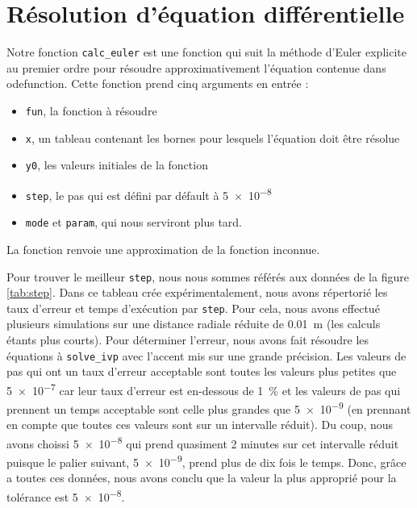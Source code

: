 \documentclass[11pt]{report}
\begin{document}
    \section{Résolution d'équation différentielle}
      Notre fonction \verb|calc_euler| est une fonction qui suit la méthode d'Euler explicite au premier ordre
      pour résoudre approximativement l'équation contenue dans odefunction.
      Cette fonction prend cinq arguments en entrée :
      \begin{itemize}
        \item \verb|fun|, la fonction à résoudre
        \item \verb|x|, un tableau contenant les bornes pour lesquels l'équation doit être résolue
        \item \verb|y0|, les valeurs initiales de la fonction
        \item \verb|step|, le pas qui est défini par défault à \num{5e-8}
        \item \verb|mode| et \verb|param|, qui nous serviront plus tard.
      \end{itemize}
      La fonction renvoie une approximation de la fonction inconnue.
      \par
      Pour trouver le meilleur \verb|step|, nous nous sommes référés aux données de la figure \ref{tab:step}.
      Dans ce tableau crée expérimentalement, nous avons répertorié les taux d'erreur et temps d'exécution par \verb|step|.
      Pour cela, nous avons effectué plusieurs simulations sur une distance radiale réduite de \SI{0.01}{\meter} (les calculs étants plus courts).
      Pour déterminer l'erreur, nous avons fait résoudre les équations à \verb|solve_ivp| avec l'accent mis sur une grande précision. Les
      valeurs de pas qui ont un taux d'erreur acceptable sont toutes les valeurs plus petites que \num{5e-7}
      car leur taux d'erreur est en-dessous de \SI{1}{\percent} et les valeurs de pas qui prennent
      un temps acceptable sont celle plus grandes que \num{5e-9} (en prennant en compte
      que toutes ces valeurs sont sur un intervalle réduit). Du coup, nous avons choissi \num{5e-8} qui prend quasiment 2 minutes
      sur cet intervalle réduit puisque le palier suivant, \num{5e-9}, prend plus de dix fois le temps.
      Donc, grâce a toutes ces données, nous avons conclu que la valeur la plus approprié pour la
      tolérance est \num{5e-8}.
      \par
\end{document}
